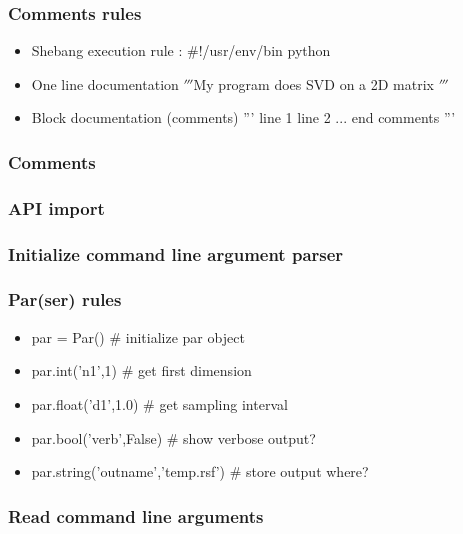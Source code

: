 \begin{frame}
\end{frame}

\begin{frame} \frametitle{Comments rules}
\begin{itemize}
\item Shebang execution rule   : $\#$!/usr/env/bin python
\item One line documentation        $'''$My program does SVD on a 2D matrix $'''$
\item Block documentation (comments)
''' line 1
	line 2
	... 
	end comments
'''
\end{itemize}
\end{frame}

\begin{frame} \frametitle{Comments}

\end{frame}

\begin{frame} \frametitle{API import}

\end{frame}

\begin{frame} \frametitle{Initialize command line argument parser}

\end{frame}

\begin{frame} \frametitle{Par(ser) rules}
\begin{itemize}
\item par = Par()                      $\#$ initialize par object
\item par.int('n1',1)                  $\#$ get first dimension              
\item par.float('d1',1.0)              $\#$ get sampling interval        
\item par.bool('verb',False)           $\#$ show verbose output?         
\item par.string('outname','temp.rsf') $\#$ store output where?
\end{itemize}
\end{frame}

\begin{frame} \frametitle{Read command line arguments}

\end{frame}

